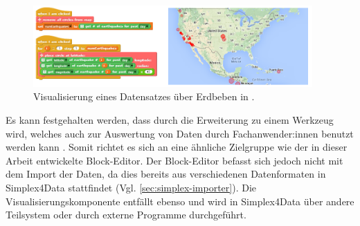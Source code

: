 \begin{figure}[!ht]
  \centering
  \includegraphics[width=0.95\textwidth]{assets/datasnap-visualization.png}
  \caption{Visualisierung eines Datensatzes über Erdbeben in \DataSnap{}. \parencite{hellmannDataSnapEnabling2015}}
  \label{fig:datasnap-visualization}
\end{figure}

Es kann festgehalten werden, dass \Snap{} durch die Erweiterung \DataSnap{} zu einem Werkzeug wird, welches auch zur Auswertung von Daten durch Fachanwender:innen benutzt werden kann \parencite{hellmannDataSnapEnabling2015}. Somit richtet es sich an eine ähnliche Zielgruppe wie der in dieser Arbeit entwickelte Block-Editor. Der Block-Editor befasst sich jedoch nicht mit dem Import der Daten, da dies bereits aus verschiedenen Datenformaten in Simplex4Data stattfindet (Vgl. \ref{sec:simplex-importer}). Die Visualisierungskomponente entfällt ebenso und wird in Simplex4Data über andere Teilsystem oder durch externe Programme durchgeführt.
